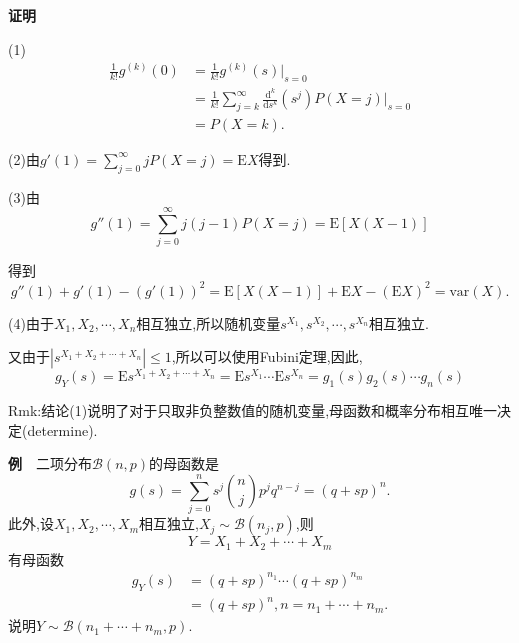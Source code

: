 \begin{frame}
	\textbf{证明}$\quad$
	
	(1)\begin{equation}
		\begin{split}
			\frac{1}{k!}g^{(k)}(0) &= \frac{1}{k!}g^{(k)}(s)\bigg|_{s=0} \\
			&= \frac{1}{k!}\sum_{j=k}^\infty\frac{\mathrm{d}^k}{\mathrm{d}s^k}(s^j)P(X=j)\bigg|_{s=0} \\
			&= P(X=k).
		\end{split}
	\end{equation}
	
	(2)由$g'(1) = \sum\limits_{j=0}^\infty jP(X=j) = \mathrm{E}X$得到.
	
	(3)由\begin{equation}
		g''(1) = \sum_{j=0}^\infty j(j-1)P(X=j) = \mathrm{E}[X(X-1)]
	\end{equation}
\end{frame}

\begin{frame}
	得到\begin{equation}
		g''(1)+g'(1) - (g'(1))^2 = \mathrm{E}[X(X-1)] + \mathrm{E}X - (\mathrm{E}X)^2 = \mathrm{var}(X).
	\end{equation}
	
	(4)由于$X_1,X_2,\cdots,X_n$相互独立,所以随机变量$s^{X_1},s^{X_2},\cdots,s^{X_n}$相互独立.
	
	又由于$\left|s^{X_1+X_2+\cdots+X_n}\right|\leqslant 1$,所以可以使用Fubini定理,因此,
	\begin{equation}
		g_Y(s) = \mathrm{E}s^{X_1+X_2+\cdots+X_n} = \mathrm{E}s^{X_1}\cdots\mathrm{E}s^{X_n} = g_1(s)g_2(s)\cdots g_n(s)
	\end{equation}
	
	Rmk:结论(1)说明了对于只取非负整数值的随机变量,\alert{母函数和概率分布相互唯一决定}(determine).
\end{frame}

\begin{frame}
	\textbf{例}$\quad$二项分布$\mathcal{B}(n,p)$的母函数是
	\begin{equation}
		g(s) = \sum_{j=0}^ns^j\binom{n}{j}p^jq^{n-j} = (q+sp)^n.
	\end{equation}
	此外,设$X_1,X_2,\cdots,X_m$相互独立,$X_j\sim \mathcal{B}(n_j,p)$,则
	\begin{equation}
		Y = X_1+X_2+\cdots+X_m
	\end{equation}
	有母函数
	\begin{equation}
		\begin{split}
			g_Y(s) &= (q+sp)^{n_1}\cdots(q+sp)^{n_m} \\
			&= (q+sp)^n,n = n_1+\cdots+n_m.
		\end{split}
	\end{equation}
	说明$Y\sim\mathcal{B}(n_1+\cdots+n_m,p)$.
\end{frame}

